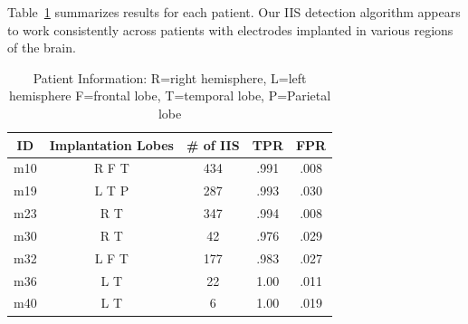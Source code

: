 \documentclass[letterpaper, 10pt, conference]{ieeeconf}      %
\begin{document}
Table~\ref{subjects} summarizes results for each patient. Our IIS detection algorithm appears to work consistently across patients with electrodes implanted in various regions of the brain.

\begin{table}
\caption{Patient Information: R=right hemisphere, L=left hemisphere F=frontal lobe, T=temporal lobe, P=Parietal lobe}
\label{table_example}
\begin{center}
\begin{tabular}{|c||c||c||c||c|}
\hline
 ID & Implantation Lobes & \# of IIS & TPR & FPR\\
\hline
m10 & R F T %
& 434 & .991 & .008\\
\hline
m19 & L T P & 287 & .993 & .030\\  %
\hline
m23 & R T& 347 & .994 & .008\\  %
\hline
m30 & R T & 42 & .976 & .029\\ %
\hline
m32 & L F T & 177 & .983 & .027\\ 
\hline
m36 & L T & 22 & 1.00 & .011\\ %
\hline
m40 & L T & 6 & 1.00 & .019\\ %
\hline
\end{tabular}
\end{center}
\label{subjects}
\end{table}
\end{document}
